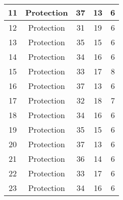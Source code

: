 \documentclass[results.tex]{subfiles}
\begin{document}
\begin{center}
\begin{tabular}{| c || c | c | c | c |}
            \hline
            11                      & Protection                   & 37                     & 13                      & 6                    \\
            \hline
            12                      & Protection                   & 31                     & 19                      & 6                    \\
            \hline
            13                      & Protection                   & 35                     & 15                      & 6                    \\
            \hline
            14                      & Protection                   & 34                     & 16                      & 6                    \\
            \hline
            15                      & Protection                   & 33                     & 17                      & 8                    \\
            \hline
            16                      & Protection                   & 37                     & 13                      & 6                    \\
            \hline
            17                      & Protection                   & 32                     & 18                      & 7                    \\
            \hline
            18                      & Protection                   & 34                     & 16                      & 6                    \\
            \hline
            19                      & Protection                   & 35                     & 15                      & 6                    \\
            \hline
            20                      & Protection                   & 37                     & 13                      & 6                    \\
            \hline
            21                      & Protection                   & 36                     & 14                      & 6                    \\
            \hline
            22                      & Protection                   & 33                     & 17                      & 6                    \\
            \hline
            23                      & Protection                   & 34                     & 16                      & 6                    \\

\end{tabular}
\end{center}
\end{document}
